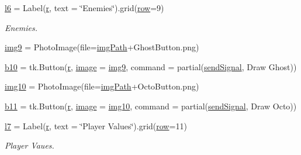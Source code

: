 \begin{DoxyCompactItemize}
\item 
\mbox{\hyperlink{namespace_g_u_i_a030836603e07318a291bb6c3ad25ff3f}{l6}} = Label(\mbox{\hyperlink{_s_d_l__opengl_8h_a42ce7cdc612e53abee15043f80220d97}{r}}, text = \char`\"{}Enemies\char`\"{}).grid(\mbox{\hyperlink{_s_d_l__opengl__glext_8h_a90d3e7e4182a9630993f640fa0443b0b}{row}}=9)
\begin{DoxyCompactList}\small\item\em Enemies. \end{DoxyCompactList}\item 
\mbox{\hyperlink{namespace_g_u_i_a6ece4b78fbb7ed63258caf1a781471f4}{img9}} = Photo\+Image(file=\mbox{\hyperlink{namespace_g_u_i_a293e22c0a27a45862ad50fcb8ed12f15}{img\+Path}}+\textquotesingle{}Ghost\+Button.\+png\textquotesingle{})
\item 
\mbox{\hyperlink{namespace_g_u_i_a385149b9ed164ef153e01cc07a42a12f}{b10}} = tk.\+Button(\mbox{\hyperlink{_s_d_l__opengl_8h_a42ce7cdc612e53abee15043f80220d97}{r}}, \mbox{\hyperlink{_s_d_l__opengl_8h_a0a221b005894579fea3b9eb7bfc2ee71}{image}} = \mbox{\hyperlink{namespace_g_u_i_a6ece4b78fbb7ed63258caf1a781471f4}{img9}}, command = partial(\mbox{\hyperlink{namespace_g_u_i_ae82f740e6453cdd542b52ede1560c2c3}{send\+Signal}}, \textquotesingle{}Draw Ghost\textquotesingle{}))
\item 
\mbox{\hyperlink{namespace_g_u_i_ae7bae4d0c7bb1a98517fed2294b60f46}{img10}} = Photo\+Image(file=\mbox{\hyperlink{namespace_g_u_i_a293e22c0a27a45862ad50fcb8ed12f15}{img\+Path}}+\textquotesingle{}Octo\+Button.\+png\textquotesingle{})
\item 
\mbox{\hyperlink{namespace_g_u_i_a737db9240917cd4bce0a7f294b6038b2}{b11}} = tk.\+Button(\mbox{\hyperlink{_s_d_l__opengl_8h_a42ce7cdc612e53abee15043f80220d97}{r}}, \mbox{\hyperlink{_s_d_l__opengl_8h_a0a221b005894579fea3b9eb7bfc2ee71}{image}} = \mbox{\hyperlink{namespace_g_u_i_ae7bae4d0c7bb1a98517fed2294b60f46}{img10}}, command = partial(\mbox{\hyperlink{namespace_g_u_i_ae82f740e6453cdd542b52ede1560c2c3}{send\+Signal}}, \textquotesingle{}Draw Octo\textquotesingle{}))
\item 
\mbox{\hyperlink{namespace_g_u_i_a3e7474bdd0fb176960a855522043a291}{l7}} = Label(\mbox{\hyperlink{_s_d_l__opengl_8h_a42ce7cdc612e53abee15043f80220d97}{r}}, text = \char`\"{}Player Values\char`\"{}).grid(\mbox{\hyperlink{_s_d_l__opengl__glext_8h_a90d3e7e4182a9630993f640fa0443b0b}{row}}=11)
\begin{DoxyCompactList}\small\item\em Player Vaues. \end{DoxyCompactList}\item 

\end{DoxyCompactItemize}
